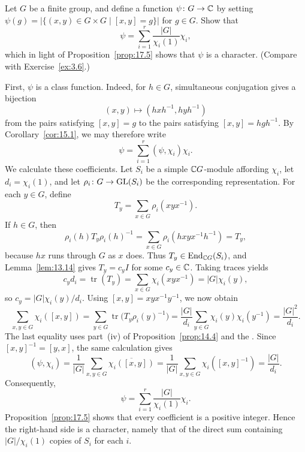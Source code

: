 \documentclass[../Odyssey_Project.tex]{subfiles}
\begin{document}
\begin{exercise}
\label{ex:17.3}
Let $G$ be a finite group, and define a function $\psi \colon G \to \mathbb{C}$ by setting $\psi(g) = |\{(x,y) \in G \times G \mid [x,y] = g\}|$ for $g \in G$. Show that
\[
\psi = \sum_{i=1}^{r} \frac{|G|}{\chi_i(1)} \chi_i,
\]
which in light of Proposition~\ref{prop:17.5} shows that $\psi$ is a character. (Compare with Exercise~\ref{ex:3.6}.)
\end{exercise}
\begin{solution}
    First, $\psi$ is a class function. Indeed, for $h\in G$, simultaneous conjugation gives a bijection
    \[
        (x,y)\longmapsto(hxh^{-1},hyh^{-1})
    \]
    from the pairs satisfying $[x,y]=g$ to the pairs satisfying $[x,y]=hgh^{-1}$. By Corollary~\ref{cor:15.1}, we may therefore write
    \[
        \psi=\sum_{i=1}^{r}(\psi,\chi_i)\chi_i.
    \]
    We calculate these coefficients. Let $S_i$ be a simple $\mathbb{C} G$-module affording $\chi_i$, let $d_i=\chi_i(1)$, and let $\rho_i\colon G\to\operatorname{GL}(S_i)$ be the corresponding representation. For each $y\in G$, define
    \[
        T_y=\sum_{x\in G}\rho_i(xyx^{-1}).
    \]
    If $h\in G$, then
    \[
        \rho_i(h)T_y\rho_i(h)^{-1}
        =\sum_{x\in G}\rho_i(hxyx^{-1}h^{-1})
        =T_y,
    \]
    because $hx$ runs through $G$ as $x$ does. Thus $T_y\in\operatorname{End}_{\mathbb{C} G}(S_i)$, and Lemma~\ref{lem:13.14} gives $T_y=c_yI$ for some $c_y\in\mathbb{C}$. Taking traces yields
    \[
        c_yd_i=\operatorname{tr}(T_y)
        =\sum_{x\in G}\chi_i(xyx^{-1})
        =|G|\chi_i(y),
    \]
    so $c_y=|G|\chi_i(y)/d_i$. Using $[x,y]=xyx^{-1}y^{-1}$, we now obtain
    \[
        \sum_{x,y\in G}\chi_i([x,y])
        =\sum_{y\in G}\operatorname{tr}\bigl(T_y\rho_i(y)^{-1}\bigr)
        =\frac{|G|}{d_i}\sum_{y\in G}\chi_i(y)\chi_i(y^{-1})
        =\frac{|G|^2}{d_i}.
    \]
    The last equality uses part~(iv) of Proposition~\ref{prop:14.4} and the . Since $[x,y]^{-1}=[y,x]$, the same calculation gives
    \[
        (\psi,\chi_i)
        =\frac{1}{|G|}\sum_{x,y\in G}\overline{\chi_i([x,y])}
        =\frac{1}{|G|}\sum_{x,y\in G}\chi_i([x,y]^{-1})
        =\frac{|G|}{d_i}.
    \]
    Consequently,
    \[
        \psi=\sum_{i=1}^{r}\frac{|G|}{\chi_i(1)}\chi_i.
    \]
    Proposition~\ref{prop:17.5} shows that every coefficient is a positive integer. Hence the right-hand side is a character, namely that of the direct sum containing $|G|/\chi_i(1)$ copies of $S_i$ for each $i$.
\end{solution}
\end{document}
